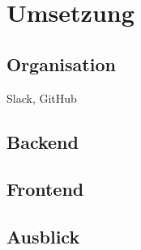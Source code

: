 \chapter{Umsetzung} 
	\section{Organisation}
	Slack, GitHub
	\section{Backend}
	\section{Frontend}
	\section{Ausblick}